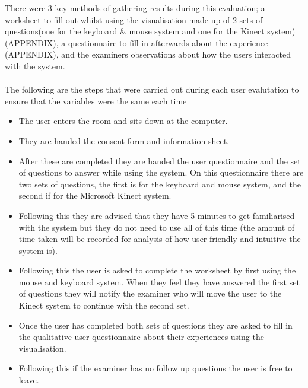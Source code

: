 There were 3 key methods of gathering results during this evaluation; a
worksheet to fill out whilst using the visualisation made up of 2 sets of questions(one for the keyboard \& mouse system and one for the Kinect system)(APPENDIX), a questionnaire to
fill in afterwards about the experience (APPENDIX), and the examiners observations about
how the users interacted with the system.  
\\\\
The following are the steps that were carried out during each user evalutation to ensure that the variables were the same each time
\begin{itemize}
\item The user enters the room and sits down at the computer.
\item They are handed the consent form and information sheet.
\item After these are completed they are handed the user questionnaire and the
set of questions to answer while using the system. On this questionnaire there
are two sets of questions, the first is for the keyboard and mouse system, and
the second if for the Microsoft Kinect system.
\item Following this they are advised that they have 5 minutes to get
familiarised with the system but they do not need to use all of this time (the
amount of time taken will be recorded for analysis of how user friendly and
intuitive the system is).
\item Following this the user is asked to complete the worksheet by first
using the mouse and keyboard system. When they feel they have answered the first set of questions they will notify the examiner who will move the user to the Kinect
system to continue with the second set.
\item Once the user has completed both sets of questions they are asked to fill
in the qualitative user questionnaire about their experiences using the
visualisation. 
\item Following this if the examiner has no follow up questions the user is free
to leave.
\end{itemize}

